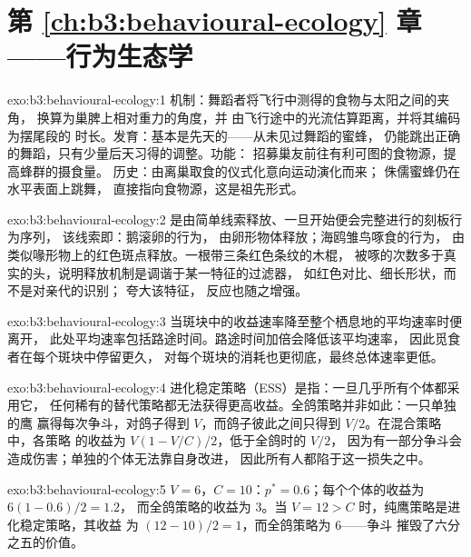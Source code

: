 \section*{第 \ref{ch:b3:behavioural-ecology} 章——行为生态学}

\begin{solution}{exo:b3:behavioural-ecology:1}
机制：舞蹈者将飞行中测得的食物与太阳之间的夹角，
换算为巢脾上相对重力的角度，并
由飞行途中的光流估算距离，并将其编码为摆尾段的
时长。发育：基本是先天的——从未见过舞蹈的蜜蜂，
仍能跳出正确的舞蹈，只有少量后天习得的调整。功能：
招募巢友前往有利可图的食物源，提高蜂群的摄食量。
历史：由离巢取食的仪式化意向运动演化而来；
侏儒蜜蜂仍在水平表面上跳舞，
直接指向食物源，这是祖先形式。
\end{solution}

\begin{solution}{exo:b3:behavioural-ecology:2}
是由简单线索释放、一旦开始便会完整进行的刻板行为序列，
该线索即：鹅滚卵的行为，
由卵形物体释放；海鸥雏鸟啄食的行为，
由类似喙形物上的红色斑点释放。一根带三条红色条纹的木棍，
被啄的次数多于真实的头，说明释放机制是调谐于某一特征的过滤器，
如红色对比、细长形状，而不是对亲代的识别；
夸大该特征，
反应也随之增强。
\end{solution}

\begin{solution}{exo:b3:behavioural-ecology:3}
当斑块中的收益速率降至整个栖息地的平均速率时便离开，
此处平均速率包括路途时间。路途时间加倍会降低该平均速率，
因此觅食者在每个斑块中停留更久，
对每个斑块的消耗也更彻底，最终总体速率更低。
\end{solution}

\begin{solution}{exo:b3:behavioural-ecology:4}
进化稳定策略（ESS）是指：一旦几乎所有个体都采用它，
任何稀有的替代策略都无法获得更高收益。全鸽策略并非如此：一只单独的鹰
赢得每次争斗，对鸽子得到 $V$，而鸽子彼此之间只得到 $V/2$。在混合策略中，各策略
的收益为 $V(1 - V/C)/2$，低于全鸽时的 $V/2$，
因为有一部分争斗会造成伤害；单独的个体无法靠自身改进，
因此所有人都陷于这一损失之中。
\end{solution}

\begin{solution}{exo:b3:behavioural-ecology:5}
$V = 6$，$C = 10$：$p^{*} = 0.6$；每个个体的收益为 $6(1 - 0.6)/2 = 1.2$，
而全鸽策略的收益为 $3$。当 $V = 12 > C$ 时，纯鹰策略是进化稳定策略，其收益
为 $(12 - 10)/2 = 1$，而全鸽策略为 $6$——争斗
摧毁了六分之五的价值。
\end{solution}

